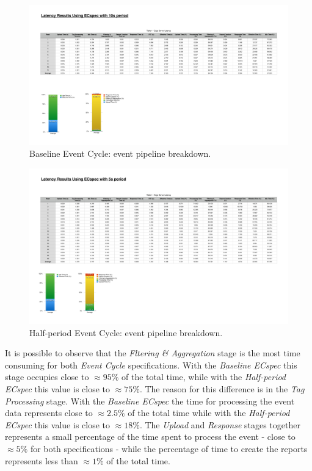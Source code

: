 \begin{figure}[ht!]
  \centering
  \includegraphics[height=.7\linewidth]{./figures/edge_ecspec_effective_breakdown}
  \caption{Baseline Event Cycle: event pipeline breakdown.}
  \label{fig:ecspec_effective_base}
\end{figure}

\begin{figure}[ht!]
  \centering
  \includegraphics[width=.7\linewidth]{./figures/edge_ecspecf_effective_breakdown}
  \caption{Half-period Event Cycle: event pipeline breakdown.}
  \label{fig:ecspec_effective_half}
\end{figure}

It is possible to observe that the \textit{Fltering \& Aggregation} stage is the most time consuming
for both \textit{Event Cycle} specifications. With the \textit{Baseline ECspec} this stage occupies
close to $\approx95\%$ of the total time, while with the \textit{Half-period ECspec} this value is
close to $\approx75\%$. The reason for this difference is in the \textit{Tag Processing} stage.
With the \textit{Baseline ECspec} the time for processing the event data represents close to $\approx2.5\%$
of the total time while with the \textit{Half-period ECspec} this value is close to $\approx18\%$.
The \textit{Upload} and \textit{Response} stages together represents a small percentage of
the time spent to process the event - close to $\approx5\%$ for both specifications - while the percentage
of time to create the reports represents less than $\approx1\%$ of the total time.

